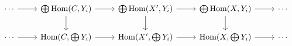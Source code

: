 \documentclass[12pt]{standalone}
\begin{document}
        $$

\begin{tikzcd}
\cdots \ar[r] & \bigoplus \operatorname{Hom}(C,Y_i) \ar[r] \ar[d] & 
\bigoplus \operatorname{Hom}(X^\prime ,Y_i) \ar[r] \ar[d] & 
\bigoplus \operatorname{Hom}(X,Y_i) \ar[r] \ar[d] & \cdots \\
\cdots \ar[r] & \operatorname{Hom}(C,\bigoplus  Y_i) \ar[r]  & 
\operatorname{Hom}(X^\prime , \bigoplus Y_i) \ar[r]  & 
\operatorname{Hom}(X,\bigoplus  Y_i) \ar[r]  & \cdots 
\end{tikzcd}
        $$
        
\end{document}
